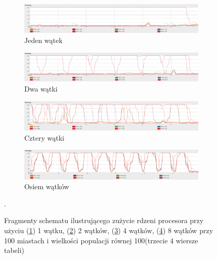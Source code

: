 \documentclass[10pt,a4paper]{article}
\begin{document}
\begin{figure}[H]
    \centering
    \begin{subfigure}[b]{\textwidth}
        \includegraphics[width=\textwidth]{32-1.png}
        \caption{Jeden wątek}
        \label{fig:32-1}
    \end{subfigure}
    
    \begin{subfigure}[b]{\textwidth}
        \includegraphics[width=\textwidth]{32-2.png}
        \caption{Dwa wątki}
        \label{fig:32-2}
    \end{subfigure}
    
    \begin{subfigure}[b]{\textwidth}
        \includegraphics[width=\textwidth]{32-4.png}
        \caption{Cztery wątki}
        \label{fig:32-4}
    \end{subfigure}
    
    \begin{subfigure}[b]{\textwidth}
            \includegraphics[width=\textwidth]{32-8.png}
            \caption{Osiem wątków}
            \label{fig:32-8}
    \end{subfigure}
    \caption{Fragmenty schematu ilustrującego zużycie rdzeni procesora przy użyciu (\ref{fig:32-1}) 1 wątku, (\ref{fig:32-2}) 2 wątków, (\ref{fig:32-4}) 4 wątków, (\ref{fig:32-8}) 8 wątków przy 100 miastach i wielkości populacji równej 100(trzecie 4 wiersze tabeli)}\label{fig:32}. 
\end{figure}
\end{document}
